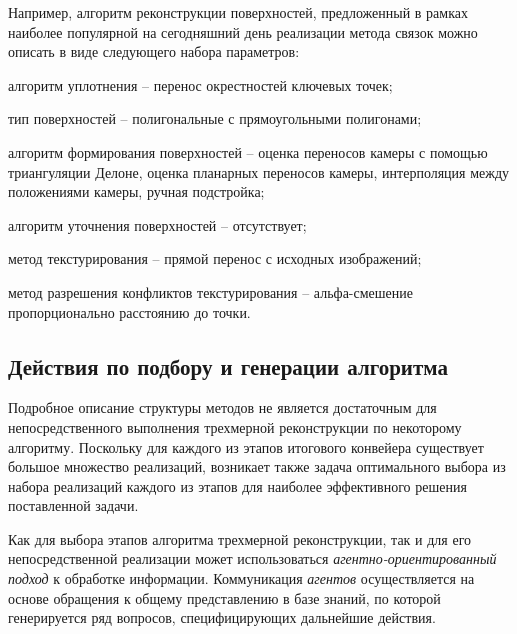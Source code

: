 Например, алгоритм реконструкции поверхностей, предложенный в рамках наиболее популярной на сегодняшний день реализации метода связок можно описать в виде следующего набора параметров:
\begin{textitemize}
    \item алгоритм уплотнения -- перенос окрестностей ключевых точек;
    \item тип поверхностей -- полигональные с прямоугольными полигонами;
    \item алгоритм формирования поверхностей -- оценка переносов камеры с помощью триангуляции Делоне, оценка планарных переносов камеры, интерполяция между положениями камеры, ручная подстройка;
    \item алгоритм уточнения поверхностей -- отсутствует;
    \item метод текстурирования -- прямой перенос с исходных изображений;
    \item метод разрешения конфликтов текстурирования -- альфа-смешение пропорционально расстоянию до точки.
\end{textitemize}

\subsection{Действия по подбору и генерации алгоритма}

Подробное описание структуры методов не является достаточным для непосредственного выполнения трехмерной реконструкции по некоторому алгоритму. Поскольку для каждого из этапов итогового конвейера существует большое множество реализаций, возникает также задача оптимального выбора из набора реализаций каждого из этапов для наиболее эффективного решения поставленной задачи.

Как для выбора этапов алгоритма трехмерной реконструкции, так и для его непосредственной реализации может использоваться \textit{агентно-ориентированный подход} к обработке информации. Коммуникация \textit{агентов} осуществляется на основе обращения к общему представлению в базе знаний, по которой генерируется ряд вопросов, специфицирующих дальнейшие действия.

